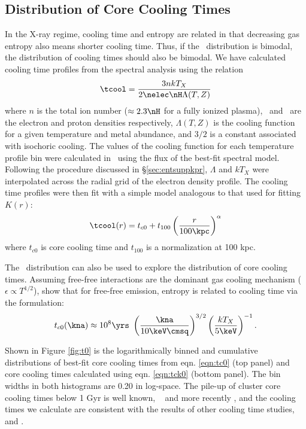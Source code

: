 \subsection{Distribution of Core Cooling Times}
\label{sec:entsupphifl}

In the X-ray regime, cooling time and entropy are related in that
decreasing gas entropy also means shorter cooling time. Thus, if the
\kna\ distribution is bimodal, the distribution of cooling times
should also be bimodal. We have calculated cooling time profiles from
the spectral analysis using the relation
\begin{equation}
\tcool = \frac{3nkT_X}{2\nelec \nH \Lambda(T,Z)}
\label{eqn:tcool}
\end{equation}
where $n$ is the total ion number ($\approx 2.3\nH$ for a fully
ionized plasma), \nelec\ and \nH\ are the electron and proton
densities respectively, $\Lambda(T,Z)$ is the cooling function for a
given temperature and metal abundance, and $3/2$ is a constant
associated with isochoric cooling. The values of the cooling function
for each temperature profile bin were calculated in \xspec\ using the
flux of the best-fit spectral model. Following the procedure discussed
in \S\ref{sec:entsuppkpr}, $\Lambda$ and $kT_X$ were interpolated across the
radial grid of the electron density profile. The cooling time profiles
were then fit with a simple model analogous to that used for fitting
$K(r)$:
\begin{equation}
\tcool(r) = t_{c0} + t_{100} \left(\frac{r}{100 \kpc}\right)^{\alpha}
\label{eqn:tc0}
\end{equation}
where $t_{c0}$ is core cooling time and $t_{100}$ is a normalization
at 100 kpc.

The \kna\ distribution can also be used to explore the distribution of
core cooling times. Assuming free-free interactions are the dominant
gas cooling mechanism (\ie\ $\epsilon \propto T^{1/2}$),
\citet{radioquiet} show that for free-free emission, entropy is
related to cooling time via the formulation:
\begin{equation}
t_{c0}(\kna) \approx 10^8 \yrs\ \left(\frac{\kna}{10 \keV \cmsq}\right)^{3/2} \left(\frac{kT_X}{5 \keV}\right)^{-1}.
\label{eqn:tck0}
\end{equation}

Shown in Figure \ref{fig:t0} is the logarithmically binned and
cumulative distributions of best-fit core cooling times from
eqn. \ref{eqn:tc0} (top panel) and core cooling times calculated using
eqn. \ref{eqn:tck0} (bottom panel). The bin widths in both histograms
are 0.20 in log-space. The pile-up of cluster core cooling times below
1 Gyr is well known, \eg\ \citep{hu85} and more recently
\citet{dunn08}, and the cooling times we calculate are consistent with
the results of other cooling time studies, \eg\
\citet{1998MNRAS.298..416P} and \citet{2008arXiv0802.1864R}.

